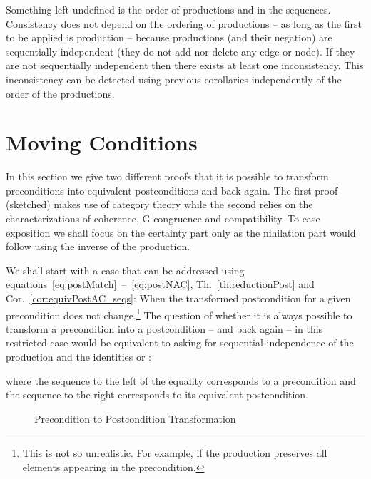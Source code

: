 \documentclass{fundam}
\begin{document}
Something left undefined is the order of productions  and
 in the sequences. Consistency does not depend on
the ordering of productions -- as long as the first to be applied is
production  -- because productions  (and their negation) are
sequentially independent (they do not add nor delete any edge or
node). If they are not sequentially independent then there exists at
least one inconsistency. This inconsistency can be detected using
previous corollaries independently of the order of the productions.

\section{Moving Conditions}
\label{sec:movingConditions}


In this section we give two different proofs that it is possible to
transform preconditions into equivalent postconditions and back
again. The first proof (sketched) makes use of category theory while
the second relies on the characterizations of coherence, G-congruence
and compatibility. To ease exposition we shall focus on the certainty
part only as the nihilation part would follow using the inverse of the
production.



We shall start with a case that can be addressed using
equations~\eqref{eq:postMatch}~--~\eqref{eq:postNAC},
Th.~\ref{th:reductionPost} and Cor.~\ref{cor:equivPostAC_seqs}: When
the transformed postcondition for a given precondition does not
change.\footnote{This is not so unrealistic. For example, if the
  production preserves all elements appearing in the precondition.}
The question of whether it is always possible to transform a
precondition into a postcondition -- and back again -- in this
restricted case would be equivalent to asking for sequential
independence of the production  and the identities  or
:

where the sequence to the left of the equality corresponds to a
precondition and the sequence to the right corresponds to its
equivalent postcondition.

\begin{figure}[htb]
  \centering
  \caption{Precondition to Postcondition Transformation}
  \label{fig:prePostTrans}
\end{figure}
\end{document}
